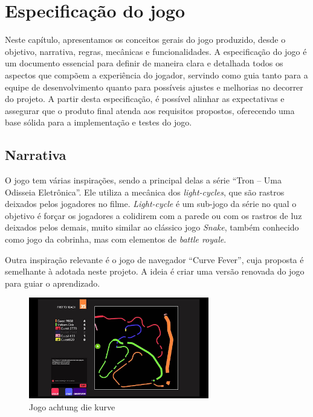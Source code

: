 \chapter[Especificação do jogo]{Especificação do jogo}

Neste capítulo, apresentamos os conceitos gerais do jogo produzido, desde o objetivo, narrativa, regras, mecânicas e funcionalidades. A especificação do jogo é um documento essencial para definir de maneira clara e detalhada todos os aspectos que compõem a experiência do jogador, servindo como guia tanto para a equipe de desenvolvimento quanto para possíveis ajustes e melhorias no decorrer do projeto. A partir desta especificação, é possível alinhar as expectativas e assegurar que o produto final atenda aos requisitos propostos, oferecendo uma base sólida para a implementação e testes do jogo.

\section{Narrativa}

O jogo tem várias inspirações, sendo a principal delas a série “Tron – Uma Odisseia Eletrônica”. Ele utiliza a mecânica dos \textit{light-cycles}, que são rastros deixados pelos jogadores no filme. \textit{Light-cycle} é um sub-jogo da série no qual o objetivo é forçar os jogadores a colidirem com a parede ou com os rastros de luz deixados pelos demais, muito similar ao clássico jogo \textit{Snake}, também conhecido como jogo da cobrinha, mas com elementos de \textit{battle royale}.

Outra inspiração relevante é o jogo de navegador “Curve Fever”, cuja proposta é semelhante à adotada neste projeto. A ideia é criar uma versão renovada do jogo para guiar o aprendizado.

\begin{figure}[htbp]
    \centering
    \caption{Jogo achtung die kurve}
    \label{fig:achtung-kurve}
    \includegraphics[width=0.7\textwidth]{figuras/kuver-fever.png}
\end{figure}


